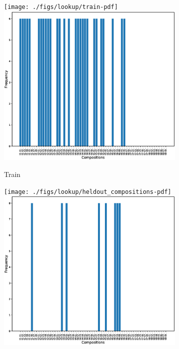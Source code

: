 \begin{figure}[ht]
	\begin{subfigure}{0.5\linewidth}
		\ifpdf
		\texttt{[image: ./figs/lookup/train-pdf]}
		\else
		\includegraphics[width=0.95\linewidth]{./figs/lookup/train-eps}
		\fi
		\caption{Train}\label{fig:train_dist}
	\end{subfigure}
	\begin{subfigure}{0.5\linewidth}
		\ifpdf
		\texttt{[image: ./figs/lookup/heldout\_compositions-pdf]}
		\else
		\includegraphics[width=0.95\linewidth]{./figs/lookup/heldout_compositions-eps}

\end{subfigure}
\end{figure}
